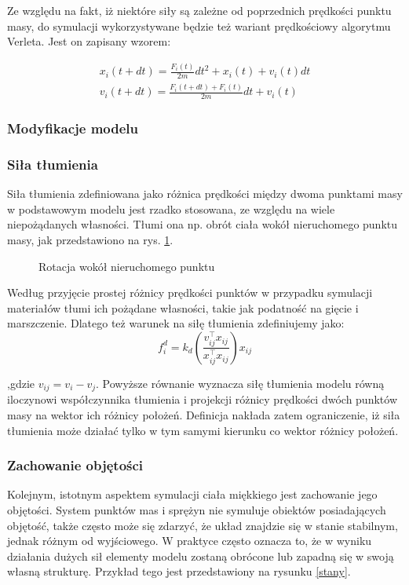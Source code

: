 Ze względu na fakt, iż niektóre siły są zależne od poprzednich prędkości punktu masy, do symulacji wykorzystywane będzie też wariant prędkościowy algorytmu Verleta. Jest on zapisany wzorem:

\begin{eqnarray}
x_i(t + dt) = \frac{F_i(t)}{2m} dt^2 + x_i(t) + v_i(t)dt \\
v_i(t + dt) = \frac{F_i(t + dt) + F_i(t)}{2m}dt + v_i(t)
\end{eqnarray}

%
%
\subsubsection{Modyfikacje modelu}

\subsubsection{Siła tłumienia}
Siła tłumienia zdefiniowana jako różnica prędkości między dwoma punktami masy w podstawowym modelu jest rzadko stosowana, ze względu na wiele niepożądanych własności. Tłumi ona np. obrót ciała wokół nieruchomego punktu masy, jak przedstawiono na rys. \ref{tlumienie}.

\begin{figure}[ht]
\centering

\caption{Rotacja wokół nieruchomego punktu}
\label{tlumienie}
\end{figure}

Według \cite{pbdo} przyjęcie prostej różnicy prędkości punktów w przypadku symulacji materiałów tłumi ich pożądane własności, takie jak podatność na gięcie i marszczenie. Dlatego też warunek na siłę tłumienia zdefiniujemy jako:
\begin{equation}
f^{d}_i = k_d (\frac{v_{ij}^\intercal x_{ij}}{x_{ij}^\intercal x_{ij}}) x_{ij}
\end{equation}

,gdzie $v_{ij} = v_i - v_j$. Powyższe równanie wyznacza siłę tłumienia modelu równą iloczynowi współczynnika tłumienia i projekcji różnicy prędkości dwóch punktów masy na wektor ich różnicy położeń. Definicja nakłada zatem ograniczenie, iż siła tłumienia może działać tylko w tym samymi kierunku co wektor różnicy położeń.

\subsubsection{Zachowanie objętości}
Kolejnym, istotnym aspektem symulacji ciała miękkiego jest zachowanie jego
objętości. System punktów mas i sprężyn nie symuluje obiektów posiadających
objętość, także często może się zdarzyć, że układ znajdzie się w stanie
stabilnym, jednak różnym od wyjściowego. W praktyce często oznacza to, że w
wyniku działania dużych sił elementy modelu zostaną obrócone lub zapadną się w
swoją własną strukturę. Przykład tego jest przedstawiony na rysunku \ref{stany}.

